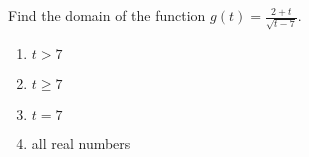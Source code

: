 \bigskip

\item  Find the domain of the function $g(t)=\frac{2+t}{\sqrt{t-7}}$.

\begin{enumerate}
\item $t> 7$
\item $t\geq 7$
\item $t=7$
\item all real numbers
\end{enumerate}

